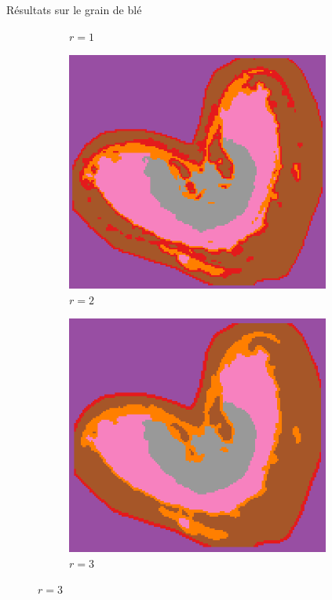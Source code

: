\documentclass[10pt]{beamer}
\begin{document}
\begin{frame}{Résultats sur le grain de blé}
\begin{figure}[ht]
\begin{subfigure}[t]{0.25\textwidth}
      \caption{$r=1$}
      \label{subfig:peaksel_prominence75_r1_full_norm_colors}
    \end{subfigure}%
    \begin{subfigure}[t]{0.25\textwidth}
      \centering
      \includegraphics[width=0.95\textwidth]{fig/peaksel_prominence75_r2_full_norm_colors}
      \caption{$r=2$}
      \label{subfig:peaksel_prominence75_r2_full_norm_colors}
    \end{subfigure}%
    \begin{subfigure}[t]{0.25\textwidth}
      \centering
      \includegraphics[width=0.95\textwidth]{fig/peaksel_prominence75_r3_full_norm_colors}
      \caption{$r=3$}
      \label{subfig:peaksel_prominence75_r3_full_norm_colors}
    \end{subfigure}

  \end{figure}

\end{frame}
\end{document}
